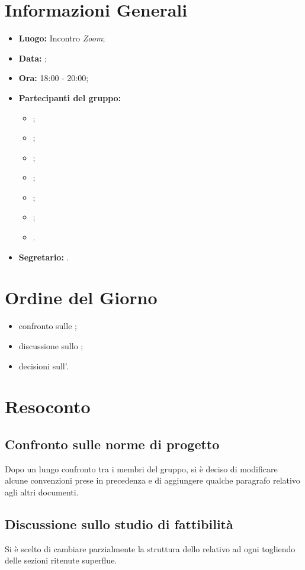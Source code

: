 \section{Informazioni Generali}
\begin{itemize}
\item \textbf{Luogo:} Incontro \textit{Zoom};
\item \textbf{Data:} \Data;
\item \textbf{Ora:} 18:00 - 20:00;
\item \textbf{Partecipanti del gruppo:}
	\begin{itemize}
		\item \BL{}; 
		\item \FF{};
		\item \MM{}; 
		\item \PC{};
		\item \TG{};
		\item \TL{};
		\item \VD{}.
	\end{itemize} 
\item \textbf{Segretario:} \PC{}.
\end{itemize}

\section{Ordine del Giorno}
\begin{itemize}
 \item confronto sulle \textit{\NdP};
 \item discussione sullo \textit{\SdF};
 \item decisioni sull'\textit{\AdR}.
\end{itemize}

\section{Resoconto}
\subsection{Confronto sulle norme di progetto}
Dopo un lungo confronto tra i membri del gruppo, si è deciso di modificare alcune convenzioni prese in precedenza e di aggiungere qualche paragrafo relativo agli altri documenti.

\subsection{Discussione sullo studio di fattibilità}
Si è scelto di cambiare parzialmente la struttura dello \textit{\SdF} relativo ad ogni  togliendo delle sezioni ritenute superflue.

